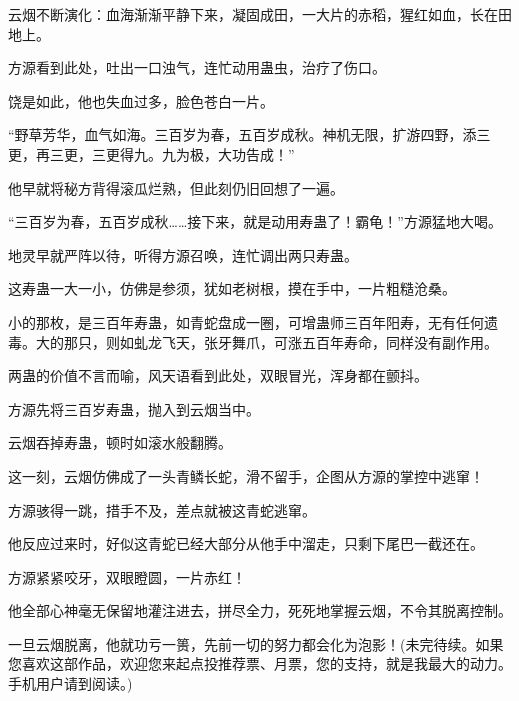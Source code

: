 \begin{this_body}
云烟不断演化：血海渐渐平静下来，凝固成田，一大片的赤稻，猩红如血，长在田地上。

方源看到此处，吐出一口浊气，连忙动用蛊虫，治疗了伤口。

饶是如此，他也失血过多，脸色苍白一片。

“野草芳华，血气如海。三百岁为春，五百岁成秋。神机无限，扩游四野，添三更，再三更，三更得九。九为极，大功告成！”

他早就将秘方背得滚瓜烂熟，但此刻仍旧回想了一遍。

“三百岁为春，五百岁成秋……接下来，就是动用寿蛊了！霸龟！”方源猛地大喝。

地灵早就严阵以待，听得方源召唤，连忙调出两只寿蛊。

这寿蛊一大一小，仿佛是参须，犹如老树根，摸在手中，一片粗糙沧桑。

小的那枚，是三百年寿蛊，如青蛇盘成一圈，可增蛊师三百年阳寿，无有任何遗毒。大的那只，则如虬龙飞天，张牙舞爪，可涨五百年寿命，同样没有副作用。

两蛊的价值不言而喻，风天语看到此处，双眼冒光，浑身都在颤抖。

方源先将三百岁寿蛊，抛入到云烟当中。

云烟吞掉寿蛊，顿时如滚水般翻腾。

这一刻，云烟仿佛成了一头青鳞长蛇，滑不留手，企图从方源的掌控中逃窜！

方源骇得一跳，措手不及，差点就被这青蛇逃窜。

他反应过来时，好似这青蛇已经大部分从他手中溜走，只剩下尾巴一截还在。

方源紧紧咬牙，双眼瞪圆，一片赤红！

他全部心神毫无保留地灌注进去，拼尽全力，死死地掌握云烟，不令其脱离控制。

一旦云烟脱离，他就功亏一篑，先前一切的努力都会化为泡影！(未完待续。如果您喜欢这部作品，欢迎您来起点投推荐票、月票，您的支持，就是我最大的动力。手机用户请到阅读。)

\end{this_body}

